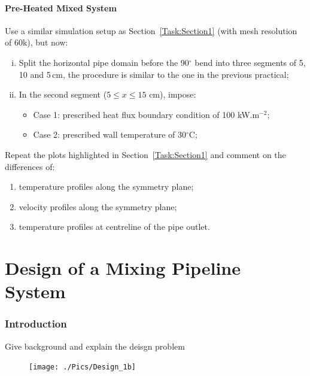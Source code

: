 \documentclass[12pts,a4paper,amsmath,amssymb,floatfix]{article}%
\begin{document}
\subsection{Pre-Heated Mixed System}
Use a similar simulation setup as Section~\ref{Task:Section1} (with mesh resolution of 60k), but now:
    \begin{enumerate}[i)]
       \item Split the horizontal pipe domain before the 90$^{\circ}$ bend into three segments of 5, 10 and 5\,cm, the procedure is similar to the one in the previous practical;
       \item In the second segment ($5\le x \le 15$ cm), impose:
       \begin{itemize}
          \item Case 1: prescribed heat flux boundary condition of 100 kW.m$^{-2}$;
          \item Case 2: prescribed wall temperature of 30$^{\circ}$C;
        \end{itemize}
    \end{enumerate}
    
    \begin{shaded}    
    Repeat the plots highlighted in Section~\ref{Task:Section1} and comment on the differences of:
    \begin{enumerate}
      \item temperature profiles along the symmetry plane;
      \item velocity profiles along the symmetry plane;
      \item temperature profiles at centreline of the pipe outlet.
    \end{enumerate}
    \end{shaded}

\clearpage

\part{Design of a Mixing Pipeline System}

\section{Introduction}
Give background and explain the deisgn problem

\begin{figure}[H] 
\texttt{[image: ./Pics/Design\_1b]}
\end{figure}
\end{document}
